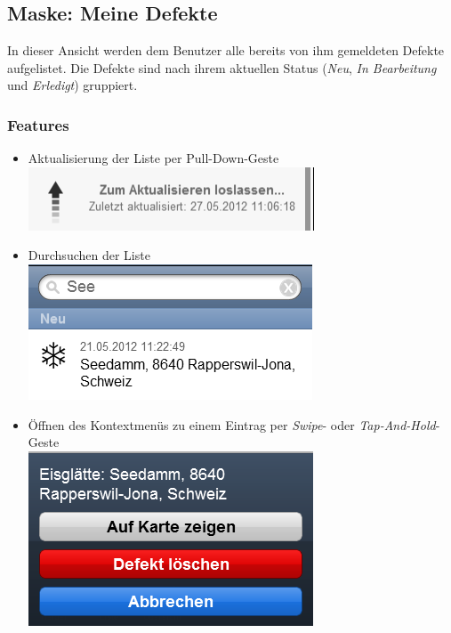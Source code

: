 \subsection{Maske: Meine Defekte}
In dieser Ansicht werden dem Benutzer alle bereits von ihm gemeldeten Defekte aufgelistet. Die Defekte sind nach ihrem aktuellen Status (\emph{Neu}, \emph{In Bearbeitung} und \emph{Erledigt}) gruppiert.

\subsubsection{Features}
\begin{itemize}
\item Aktualisierung der Liste per Pull-Down-Geste \\ \includegraphics[scale=0.8]{images/usecase2-fixmystreet/features/features-list-pull_down_refresh}
\item Durchsuchen der Liste \\ \includegraphics[scale=0.8]{images/usecase2-fixmystreet/features/features-list-search}
\item Öffnen des Kontextmenüs zu einem Eintrag per \emph{Swipe}- oder \emph{Tap-And-Hold}-Geste \\ \includegraphics[scale=0.8]{images/usecase2-fixmystreet/features/features-list-contextmenu}
\end{itemize}

